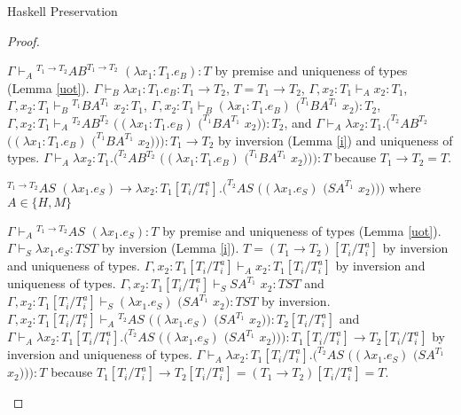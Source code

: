 \begin{theorem}{Haskell Preservation}
\begin{proof}
\begin{case}{\redruleh{\oshmfabsl}{\oshmfabsr}}
$\Gamma\vdash_{A}{^{T_{1}\rightarrow T_{2}}}AB^{T_{1}\rightarrow T_{2}}$ $(\lambda x_{1}:T_{1}.e_{B}):T$ by premise and uniqueness of types (Lemma \ref{uot}).  $\Gamma\vdash_{B}\lambda x_{1}:T_{1}.e_{B}:T_{1}\rightarrow T_{2}$, $T=T_{1}\rightarrow T_{2}$, $\Gamma,x_{2}:T_{1}\vdash_{A}x_{2}:T_{1}$, $\Gamma,x_{2}:T_{1}\vdash_{B}{^{T_{1}}B}A^{T_{1}}$ $x_{2}:T_{1}$, $\Gamma,x_{2}:T_{1}\vdash_{B}(\lambda x_{1}:T_{1}.e_{B})$ $(^{T_{1}}BA^{T_{1}}$ $x_{2}):T_{2}$, $\Gamma,x_{2}:T_{1}\vdash_{A}{^{T_{2}}A}B^{T_{2}}$ $((\lambda x_{1}:T_{1}.e_{B})$ $(^{T_{1}}BA^{T_{1}}$ $x_{2})):T_{2}$, and $\Gamma\vdash_{A}\lambda x_{2}:T_{1}.(^{T_{2}}AB^{T_{2}}$ $((\lambda x_{1}:T_{1}.e_{B})$ $(^{T_{1}}BA^{T_{1}}$ $x_{2}))):T_{1}\rightarrow T_{2}$ by inversion (Lemma \ref{i}) and uniqueness of types.  $\Gamma\vdash_{A}\lambda x_{2}:T_{1}.(^{T_{2}}AB^{T_{2}}$ $((\lambda x_{1}:T_{1}.e_{B})$ $(^{T_{1}}BA^{T_{1}}$ $x_{2}))):T$ because $T_{1}\rightarrow T_{2}=T$.
\end{case}


\begin{case}
$^{T_{1}\rightarrow T_{2}}AS$ $(\lambda x_{1}.e_{S})\rightarrow\lambda x_{2}:T_{1}[T_{i}/T_{i}^{a}].(^{T_{2}}AS$ $((\lambda x_{1}.e_{S})$ $(SA^{T_{1}}$ $x_{2})))$ where $A\in\lbrace H,M\rbrace$

$\Gamma\vdash_{A}{^{T_{1}\rightarrow T_{2}}A}S$ $(\lambda x_{1}.e_{S}):T$ by premise and uniqueness of types (Lemma \ref{uot}).  $\Gamma\vdash_{S}\lambda x_{1}.e_{S}:TST$ by inversion (Lemma \ref{i}).  $T=(T_{1}\rightarrow T_{2})[T_{i}/T_{i}^{a}]$ by inversion and uniqueness of types.  $\Gamma,x_{2}:T_{1}[T_{i}/T_{i}^{a}]\vdash_{A}x_{2}:T_{1}[T_{i}/T_{i}^{a}]$ by inversion and uniqueness of types.  $\Gamma,x_{2}:T_{1}[T_{i}/T_{i}^{a}]\vdash_{S}SA^{T_{1}}$ $x_{2}:TST$ and $\Gamma,x_{2}:T_{1}[T_{i}/T_{i}^{a}]\vdash_{S}(\lambda x_{1}.e_{S})$ $(SA^{T_{1}}$ $x_{2}):TST$ by inversion.  $\Gamma,x_{2}:T_{1}[T_{i}/T_{i}^{a}]\vdash_{A}{^{T_{2}}A}S$ $((\lambda x_{1}.e_{S})$ $(SA^{T_{1}}$ $x_{2})):T_{2}[T_{i}/T_{i}^{a}]$ and $\Gamma\vdash_{A}\lambda x_{2}:T_{1}[T_{i}/T_{i}^{a}].(^{T_{2}}AS$ $((\lambda x_{1}.e_{S})$ $(SA^{T_{1}}$ $x_{2}))):T_{1}[T_{i}/T_{i}^{a}]\rightarrow T_{2}[T_{i}/T_{i}^{a}]$ by inversion and uniqueness of types.  $\Gamma\vdash_{A}\lambda x_{2}:T_{1}[T_{i}/T_{i}^{a}].(^{T_{2}}AS$ $((\lambda x_{1}.e_{S})$ $(SA^{T_{1}}$ $x_{2}))):T$ because $T_{1}[T_{i}/T_{i}^{a}]\rightarrow T_{2}[T_{i}/T_{i}^{a}]=(T_{1}\rightarrow T_{2})[T_{i}/T_{i}^{a}]=T$.
\end{case}


\end{proof}
\end{theorem}
